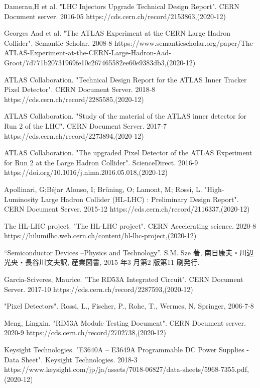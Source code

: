 \begin{thebibliography}{9}

Damerau,H et al. "LHC Injectors Upgrade Technical Design Report". CERN Document server. 2016-05
https://cds.cern.ch/record/2153863,(2020-12)

Georges Aad et al. "The ATLAS Experiment at the CERN Large Hadron Collider". Semantic Scholar. 2008-8
https://www.semanticscholar.org/paper/The-ATLAS-Experiment-at-the-CERN-Large-Hadron-Aad-Groot/7d771b20731969fe10c267465582ee60e9383db3,(2020-12)

ATLAS Collaboration. "Technical Design Report for the ATLAS Inner Tracker Pixel Detector". CERN Document Server. 2018-8
https://cds.cern.ch/record/2285585,(2020-12)

ATLAS Collaboration. "Study of the material of the ATLAS inner detector for Run 2 of the LHC". CERN Document Server. 2017-7
https://cds.cern.ch/record/2273894,(2020-12)

ATLAS Collaboration. "The upgraded Pixel Detector of the ATLAS Experiment for Run 2 at the Large Hadron Collider". ScienceDirect. 2016-9
https://doi.org/10.1016/j.nima.2016.05.018,(2020-12)

Apollinari, G;Béjar Alonso, I; Brüning, O; Lamont, M; Rossi, L. "High-Luminosity Large Hadron Collider (HL-LHC) : Preliminary Design Report". CERN Document Server. 2015-12
https://cds.cern.ch/record/2116337,(2020-12)

The HL-LHC project. "The HL-LHC project". CERN Accelerating science. 2020-8
https://hilumilhc.web.cern.ch/content/hl-lhc-project,(2020-12)

“Semiconductor Devices –Physics and Technology”.
S.M. Sze 著, 南日康夫・川辺光央・長谷川文夫訳, 産業図書, 2015 年3 月第2 版第11 刷発行.

Garcia-Sciveres, Maurice. "The RD53A Integrated Circuit". CERN Document Server. 2017-10
https://cds.cern.ch/record/2287593,(2020-12)

"Pixel Detectors". 
Rossi, L., Fischer, P., Rohe, T., Wermes, N. Springer, 2006-7-8

Meng, Lingxin. "RD53A Module Testing Document". CERN Document server. 2020-9
https://cds.cern.ch/record/2702738,(2020-12)

Keysight Technologies. "E3640A – E3649A Programmable DC Power Supplies - Data Sheet". Keysight Technologies. 2018-3
https://www.keysight.com/jp/ja/assets/7018-06827/data-sheets/5968-7355.pdf,(2020-12)


\end{thebibliography}
